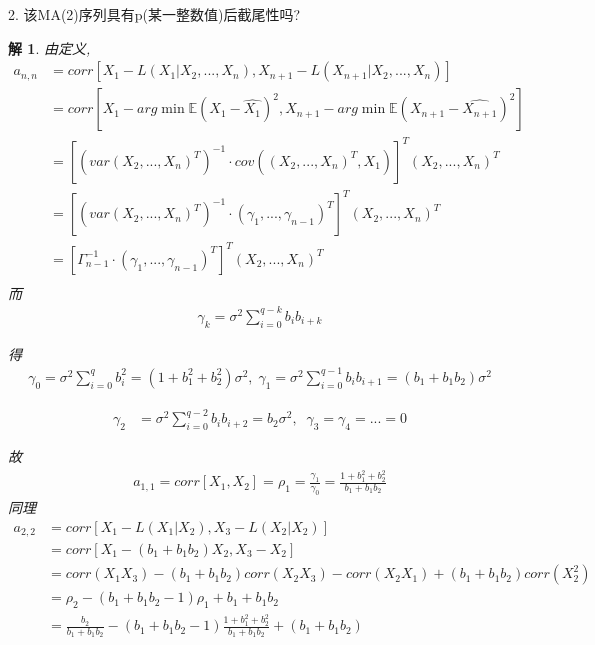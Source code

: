 \documentclass[11pt,a4paper]{ctexart}
\newtheorem*{solution}{解}
\begin{document}
\begin{enumerate}
2. 该MA(2)序列具有p(某一整数值)后截尾性吗?
\begin{solution}
由定义,
\begin{equation}
\begin{aligned}
a_{n,n} 
&= corr[X_1-L(X_1|X_2,...,X_n),X_{n+1}-L(X_{n+1}|X_2,...,X_n)]\\
&= corr[X_1-arg\min\mathbb{E}(X_1-\hat{X_1})^2,X_{n+1}-arg\min\mathbb{E}(X_{n+1}-\hat{X_{n+1}})^2]\\
&= [(var(X_2,...,X_n)^T)^{-1}\cdot cov((X_2,...,X_n)^T,X_1)]^T(X_2,...,X_n)^T\\
&= [(var(X_2,...,X_n)^T)^{-1}\cdot (\gamma_1,...,\gamma_{n-1})^T]^T(X_2,...,X_n)^T\\
&= [\Gamma_{n-1}^{-1}\cdot (\gamma_1,...,\gamma_{n-1})^T]^T(X_2,...,X_n)^T\\ 
\end{aligned} 
\end{equation}
而
\begin{equation}
\begin{aligned}
\gamma_k=\sigma^2\sum_{i=0}^{q-k}b_ib_{i+k}
\end{aligned} 
\end{equation}

得
\begin{equation}
\begin{aligned}
\gamma_0
= \sigma^2\sum_{i=0}^{q}b_i^2=(1+b_1^2+b_2^2)\sigma^2,\;\gamma_1
= \sigma^2\sum_{i=0}^{q-1}b_ib_{i+1}=(b_1+b_1b_2)\sigma^2
\end{aligned} 
\end{equation}

\begin{equation}
	\begin{aligned}
		\gamma_2
		&= \sigma^2\sum_{i=0}^{q-2}b_ib_{i+2}=b_2\sigma^2,\;\;\gamma_3=\gamma_4=...= 0
	\end{aligned} 
\end{equation}

故
\begin{equation}
	\begin{aligned}
		a_{1,1}=corr[X_1,X_2]=\rho_1=\frac{\gamma_1}{\gamma_0}=\frac{1+b_1^2+b_2^2}{b_1+b_1b_2}
	\end{aligned} 
\end{equation}
同理
\begin{equation}
	\begin{aligned}
		a_{2,2}
		&=corr[X_1-L(X_1|X_2),X_3-L(X_2|X_2)]\\
		&=corr[X_1-(b_1+b_1b_2)X_2,X_3-X_2]\\
		&=corr(X_1X_3)-(b_1+b_1b_2)corr(X_2X_3)-corr(X_2X_1)+(b_1+b_1b_2)corr(X_2^2)\\
		&=\rho_2-(b_1+b_1b_2-1)\rho_1+b_1+b_1b_2\\
		&=\frac{b_2}{b_1+b_1b_2}-(b_1+b_1b_2-1)\frac{1+b_1^2+b_2^2}{b_1+b_1b_2}+(b_1+b_1b_2)\\
	\end{aligned} 
\end{equation}


\end{solution}
\end{enumerate}
\end{document}
